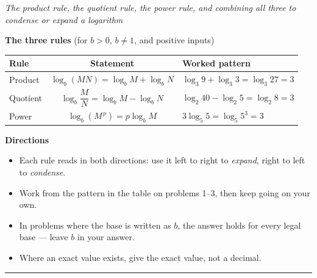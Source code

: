 \documentclass[12pt]{article}
\begin{document}

\begin{center}
\textit{The product rule, the quotient rule, the power rule, and combining all three to condense or expand a logarithm}
\end{center}

\noindent\textbf{The three rules} (for $b>0$, $b \ne 1$, and positive inputs)

\begin{center}
\begin{tabular}{|l|c|l|}
\hline
\textbf{Rule} & \textbf{Statement} & \textbf{Worked pattern} \\
\hline
Product & $\log_b(MN) = \log_b M + \log_b N$ & $\log_3 9 + \log_3 3 = \log_3 27 = 3$ \\
\hline
Quotient & $\log_b\!\dfrac{M}{N} = \log_b M - \log_b N$ & $\log_2 40 - \log_2 5 = \log_2 8 = 3$ \\
\hline
Power & $\log_b(M^{\,p}) = p\log_b M$ & $3\log_5 5 = \log_5 5^3 = 3$ \\
\hline
\end{tabular}
\end{center}

\noindent\textbf{Directions}
\begin{itemize}[leftmargin=1.1cm, itemsep=1pt, topsep=3pt]
  \item Each rule reads in both directions: use it left to right to \emph{expand}, right to left to \emph{condense}.
  \item Work from the pattern in the table on problems 1--3, then keep going on your own.
  \item In problems where the base is written as $b$, the answer holds for every legal base --- leave $b$ in your answer.
  \item Where an exact value exists, give the exact value, not a decimal.
\end{itemize}

\vspace{0.2cm}
\noindent\rule{\linewidth}{0.4pt}




\end{document}
